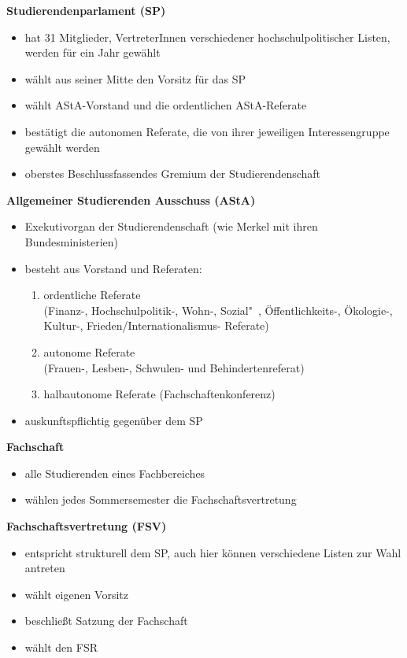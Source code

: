 \textbf{Studierendenparlament (SP)}
\begin{itemize}
  \item hat 31 Mitglieder, VertreterInnen verschiedener hochschulpolitischer Listen, werden für ein Jahr gewählt
  \item wählt aus seiner Mitte den Vorsitz für das SP
  \item wählt AStA-Vorstand und die ordentlichen AStA-Referate
  \item bestätigt die autonomen Referate, die von ihrer jeweiligen Interessengruppe gewählt werden
  \item oberstes Beschlussfassendes Gremium der Studierendenschaft
\end{itemize}

\textbf{Allgemeiner Studierenden Ausschuss (AStA)}
\begin{itemize}
  \item Exekutivorgan der Studierendenschaft (wie Merkel mit ihren Bundesministerien)
  \item besteht aus Vorstand und Referaten:
    \begin{enumerate}
      \item ordentliche Referate \\ (Finanz-, Hochschulpolitik-, Wohn-, Sozial"~, Öffentlichkeits-, Ökologie-, Kultur-, Frieden/Internationalismus- Referate)
      \item autonome Referate \\ (Frauen-, Lesben-, Schwulen- und Behindertenreferat)
      \item halbautonome Referate (Fachschaftenkonferenz)
    \end{enumerate}
  \item auskunftspflichtig gegenüber dem SP
\end{itemize}

\textbf{Fachschaft}
\begin{itemize}
  \item alle Studierenden eines Fachbereiches
  \item wählen jedes Sommersemester die Fachschaftsvertretung                                                  
\end{itemize}

\textbf{Fachschaftsvertretung (FSV)}
\begin{itemize}
  \item entspricht strukturell dem SP, auch hier können verschiedene Listen zur Wahl antreten
  \item wählt eigenen Vorsitz
  \item beschließt Satzung der Fachschaft
  \item wählt den FSR
\end{itemize}

